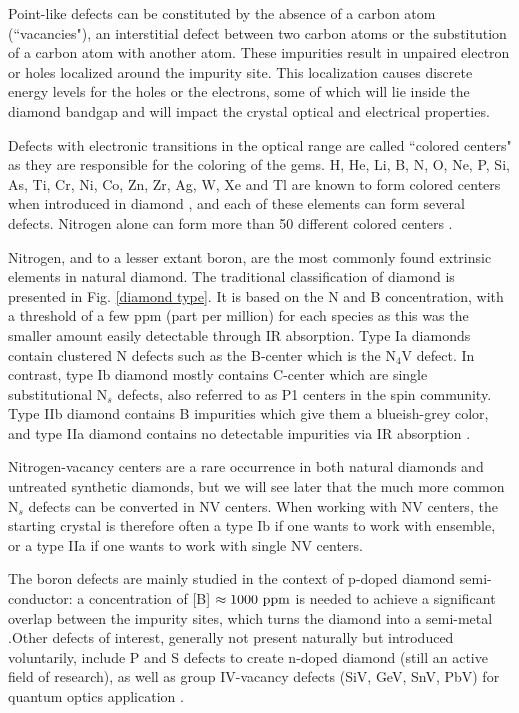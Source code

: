 \documentclass[a4paper,11pt]{report}
\begin{document}
Point-like defects can be constituted by the absence of a carbon atom (``vacancies"), an interstitial defect between two carbon atoms or the substitution of a carbon atom with another atom. These impurities result in unpaired electron or holes localized around the impurity site. This localization causes discrete energy levels for the holes or the electrons, some of which will lie inside the diamond bandgap and will impact the crystal optical and electrical properties. 

Defects with electronic transitions in the optical range are called ``colored centers" as they are responsible for the coloring of the gems.  H, He, Li, B, N,
O, Ne, P, Si, As, Ti, Cr, Ni, Co, Zn, Zr, Ag, W, Xe and Tl are known to form colored centers when introduced in diamond \citep{zaitsev2013optical, shenderova2019synthesis}, and each of these elements can form several defects. Nitrogen alone can form more than 50 different colored centers \citep{dobrinets2016hpht, ashfold2020nitrogen}.

Nitrogen, and to a lesser extant boron, are the most commonly found extrinsic elements in natural diamond. The traditional classification of diamond is presented in Fig. \ref{diamond type}. It is based on the N and B concentration, with a threshold of a few ppm (part per million) for each species as this was the smaller amount easily detectable through IR absorption. Type Ia diamonds contain clustered N defects such as the B-center which is the N$_4$V defect. In contrast, type Ib diamond mostly contains C-center which are single substitutional N$_s$ defects, also referred to as P1 centers in the spin community. Type IIb diamond contains B impurities which give them a blueish-grey color, and type IIa diamond contains no detectable impurities via IR absorption \citep{ashfold2020nitrogen}.

Nitrogen-vacancy centers are a rare occurrence in both natural diamonds and untreated synthetic diamonds, but we will see later that the much more common N$_s$ defects can be converted in NV centers. When working with NV centers, the starting crystal is therefore often a type Ib if one wants to work with ensemble, or a type IIa if one wants to work with single NV centers.

The boron defects are mainly studied in the context of p-doped diamond semi-conductor: a concentration of [B] $\approx 1000\ \rm ppm$ is needed to achieve a significant overlap between the impurity sites, which turns the diamond into a semi-metal \citep{macpherson2015practical}.Other defects of interest, generally not present naturally but introduced voluntarily, include P and S defects to create n-doped diamond \citep{das2022diamond} (still an active field of research), as well as group IV-vacancy defects (SiV, GeV, SnV, PbV) for quantum optics application \citep{bradac2019quantum}. 
\end{document}
